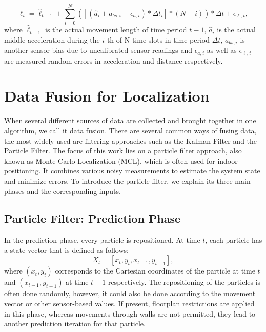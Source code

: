 \begin{equation}
\ell_{t} = \hat{\ell}_{t-1} + \sum_{i=0}^{N}([(\hat{a}_{i} + a_{bs,i} +\epsilon_{a, i}) * \Delta t_{i} ]*(N-i)) *\Delta t + \epsilon_{\ell, t},
\label{eqn:stride_length}
\end{equation}
where $\hat{\ell}_{t-1}$ is the actual movement length of time period $t-1$, $\hat{a}_{i}$ is the actual middle acceleration during the $i$-th of N time slots in time period $\Delta t$, $a_{bs,i}$ is another sensor bias due to uncalibrated sensor readings and $\epsilon_{a, i}$ as well as $\epsilon_{\ell, t}$ are measured random errors in acceleration and distance respectively.



\section{Data Fusion for Localization}
When several different sources of data are collected and brought together in one algorithm, we call it data fusion. There are several common ways of fusing data, the most widely used are filtering approaches such as the Kalman Filter \cite{Kurt} and the Particle Filter. The focus of this work lies on a particle filter approach, also known as Monte Carlo Localization (MCL), which is often used for indoor positioning. It combines various noisy measurements to estimate the system state and minimize errors. To introduce the particle filter, we explain its three main phases and the corresponding inputs. 

\subsection{Particle Filter: Prediction Phase}
In the prediction phase, every particle is repositioned. At time $t$, each particle has a state vector that is defined as follows:
\begin{equation}
X_{t} = [x_{t}, y_{t}, x_{t-1}, y_{t-1}],
\label{eqn:particles}
\end{equation}
where $(x_{t}, y_{t})$ corresponds to the Cartesian coordinates of the particle at time $t$ and $(x_{t-1}, y_{t-1})$ at time $t-1$ respectively. The repositioning of the particles is often done randomly, however, it could also be done according to the movement vector or other sensor-based values. If present, floorplan restrictions are applied in this phase, whereas movements through walls are not permitted, they lead to another prediction iteration for that particle.

